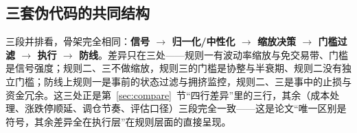 \subsection{三套伪代码的共同结构}

三段并排看，骨架完全相同：\textbf{信号 $\to$ 归一化/中性化 $\to$ 缩放决策 $\to$ 门槛过滤 $\to$ 执行 $\to$ 防线}。差异只在三处——规则一有波动率缩放与免交易带、门槛是信号强度；规则二、三不做缩放，规则三的门槛是协整与半衰期、规则二没有独立门槛；防线上规则一是事前的状态过滤与拥挤监控，规则二、三是事中的止损与资金冗余。这三处正是第~\ref{sec:compare}~节“四行差异”里的三行，其余（成本处理、涨跌停顺延、调仓节奏、评估口径）三段完全一致——这是论文“唯一区别是符号，其余差异全在执行层”在规则层面的直接呈现。

